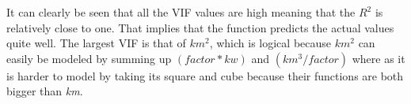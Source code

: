 \noindent
It can clearly be seen that all the VIF values are high meaning that the $R^2$ is relatively close to one. That implies that the function predicts the actual values quite well. The largest VIF is that of $km^2$, which is logical because $km^2$ can easily be modeled by summing up  $(factor * kw)$ and $(km^3 / factor)$ where as it is harder to model  by taking its square and cube because their functions are both bigger than \textit{km}.



